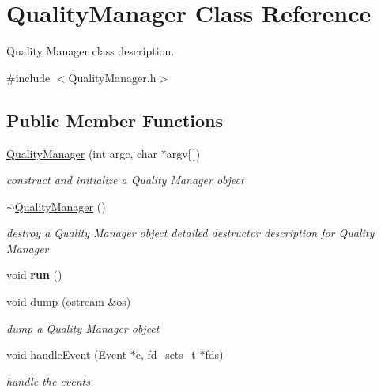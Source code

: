 \hypertarget{classQualityManager}{}\section{Quality\+Manager Class Reference}
\label{classQualityManager}


Quality Manager class description.  




{\ttfamily \#include $<$Quality\+Manager.\+h$>$}

\subsection*{Public Member Functions}
\begin{DoxyCompactItemize}
\item 
\hyperlink{classQualityManager_a0ac2ca4170c2b202b06501dc1be517ee}{Quality\+Manager} (int argc, char $\ast$argv\mbox{[}$\,$\mbox{]})
\begin{DoxyCompactList}\small\item\em construct and initialize a Quality Manager object \end{DoxyCompactList}\item 
\mbox{\label{classQualityManager_a5002f1818e38a04f58a0419eb3eda29e}} 
\hyperlink{classQualityManager_a5002f1818e38a04f58a0419eb3eda29e}{$\sim$\+Quality\+Manager} ()
\begin{DoxyCompactList}\small\item\em destroy a Quality Manager object detailed destructor description for Quality Manager \end{DoxyCompactList}\item 
\mbox{\label{classQualityManager_ae822d80c4e5108e3a92cadccd16ae7f4}} 
void {\bfseries run} ()
\item 
\mbox{\label{classQualityManager_a8f8fb9e821500a0669faff26057d4abd}} 
void \hyperlink{classQualityManager_a8f8fb9e821500a0669faff26057d4abd}{dump} (ostream \&os)
\begin{DoxyCompactList}\small\item\em dump a Quality Manager object \end{DoxyCompactList}\item 
\mbox{\label{classQualityManager_a47b33c808619f174d50059d99ac1a748}} 
void \hyperlink{classQualityManager_a47b33c808619f174d50059d99ac1a748}{handle\+Event} (\hyperlink{classEvent}{Event} $\ast$e, \hyperlink{structfd__sets__t}{fd\+\_\+sets\+\_\+t} $\ast$fds)
\begin{DoxyCompactList}\small\item\em handle the events \end{DoxyCompactList}\end{DoxyCompactItemize}
